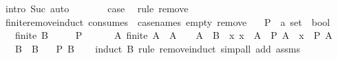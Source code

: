 \begin{isabellebody}
\ {\isacharparenleft}{\kern0pt}intro\ Suc{\isacharparenright}{\kern0pt}\ auto\isanewline
\ \ \ \ \isamarkupfalse%
\ \isamarkupfalse%
\ {\isacharquery}{\kern0pt}case\ \isamarkupfalse%
\ {\isacharparenleft}{\kern0pt}rule\ remove{\isacharparenright}{\kern0pt}\isanewline
\ \ \isamarkupfalse%
\isanewline
{}\isamarkupfalse%
%
\endisatagproof
{\isafoldproof}%
%
\isadelimproof
\isanewline
%
\endisadelimproof
\isanewline
{}\isamarkupfalse%
\ finite{\isacharunderscore}{\kern0pt}remove{\isacharunderscore}{\kern0pt}induct\ {\isacharbrackleft}{\kern0pt}consumes\ {}{\isacharcomma}{\kern0pt}\ case{\isacharunderscore}{\kern0pt}names\ empty\ remove{\isacharbrackright}{\kern0pt}{\isacharcolon}{\kern0pt}\isanewline
\ \ \ P\ {\isacharcolon}{\kern0pt}{\isacharcolon}{\kern0pt}\ {\isachardoublequoteopen}{\isacharprime}{\kern0pt}a\ set\ {\isasymRightarrow}\ bool{\isachardoublequoteclose}\isanewline
\ \ \ {\isachardoublequoteopen}finite\ B{\isachardoublequoteclose}\isanewline
\ \ \ \ \ {\isachardoublequoteopen}P\ {\isacharbraceleft}{\kern0pt}{\isacharbraceright}{\kern0pt}{\isachardoublequoteclose}\isanewline
\ \ \ \ \ {\isachardoublequoteopen}{\isasymAnd}A{\isachardot}{\kern0pt}\ finite\ A\ {\isasymLongrightarrow}\ A\ {\isasymnoteq}\ {\isacharbraceleft}{\kern0pt}{\isacharbraceright}{\kern0pt}\ {\isasymLongrightarrow}\ A\ {\isasymsubseteq}\ B\ {\isasymLongrightarrow}\ {\isacharparenleft}{\kern0pt}{\isasymAnd}x{\isachardot}{\kern0pt}\ x\ {\isasymin}\ A\ {\isasymLongrightarrow}\ P\ {\isacharparenleft}{\kern0pt}A\ {\isacharminus}{\kern0pt}\ {\isacharbraceleft}{\kern0pt}x{\isacharbraceright}{\kern0pt}{\isacharparenright}{\kern0pt}{\isacharparenright}{\kern0pt}\ {\isasymLongrightarrow}\ P\ A{\isachardoublequoteclose}\isanewline
\ \ \ {\isachardoublequoteopen}B{\isacharprime}{\kern0pt}\ {\isasymequiv}\ B{\isachardoublequoteclose}\isanewline
\ \ \ {\isachardoublequoteopen}P\ B{\isacharprime}{\kern0pt}{\isachardoublequoteclose}\isanewline
%
\isadelimproof
\ \ %
\endisadelimproof
%
\isatagproof
{}\isamarkupfalse%
\ {\isacharparenleft}{\kern0pt}induct\ B{\isacharprime}{\kern0pt}\ rule{\isacharcolon}{\kern0pt}\ remove{\isacharunderscore}{\kern0pt}induct{\isacharparenright}{\kern0pt}\ {\isacharparenleft}{\kern0pt}simp{\isacharunderscore}{\kern0pt}all\ add{\isacharcolon}{\kern0pt}\ assms{\isacharparenright}{\kern0pt}%
\endisatagproof
{\isafoldproof}%
%
\isadelimproof

\end{isabellebody}
